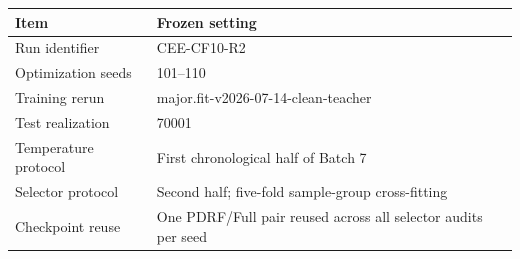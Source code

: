 \begin{tabular}{lp{}}
\toprule
Item & Frozen setting \\
\midrule
Run identifier & CEE-CF10-R2 \\
Optimization seeds & 101--110 \\
Training rerun & major.fit-v2026-07-14-clean-teacher \\
Test realization & 70001 \\
Temperature protocol & First chronological half of Batch 7 \\
Selector protocol & Second half; five-fold sample-group cross-fitting \\
Checkpoint reuse & One PDRF/Full pair reused across all selector audits per seed \\
\bottomrule
\end{tabular}
